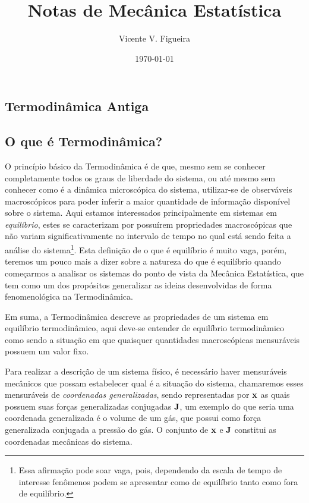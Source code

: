 \documentclass[twoside]{amsart}
\title{
Notas de Mecânica Estatística
}
\author{
  Vicente V. Figueira
       }
\date{\today}
\numberwithin{equation}{section}
\begin{document}
\maketitle

\tableofcontents


\begin{refsection}
\section{Termodinâmica Antiga}

\subsection{O que é Termodinâmica?}

O princípio básico da Termodinâmica é de que, mesmo sem se conhecer completamente todos os graus de liberdade 
do sistema, ou até mesmo sem conhecer como é a dinâmica microscópica do sistema, utilizar-se de observáveis 
macroscópicos para poder inferir a maior quantidade de informação disponível sobre o sistema. Aqui estamos 
interessados principalmente em sistemas em \emph{equilíbrio}, estes se caracterizam por possuírem propriedades 
macroscópicas que não variam significativamente no intervalo de tempo no qual está sendo feita a análise do 
sistema\footnote{Essa afirmação pode soar vaga, pois, dependendo da escala de tempo de interesse fenômenos podem se apresentar como de equilíbrio tanto como fora de equilíbrio.}. Esta definição de o que é equilíbrio é muito vaga, porém, teremos um pouco mais a dizer sobre a natureza 
do que é equilíbrio quando começarmos a analisar os sistemas do ponto de vista da Mecânica Estatística, que 
tem como um dos propósitos generalizar as ideias desenvolvidas de forma fenomenológica na Termodinâmica. 

Em suma, a Termodinâmica descreve as propriedades de um sistema em equilíbrio termodinâmico, aqui deve-se 
entender de equilíbrio termodinâmico como sendo a situação em que quaisquer quantidades macroscópicas mensuráveis possuem um valor fixo.

Para realizar a descrição de um sistema físico, é necessário haver mensuráveis mecânicos que possam estabelecer qual é a situação do sistema, chamaremos esses mensuráveis de \emph{coordenadas generalizadas}, 
sendo representadas por $\vb x$ as quais possuem suas forças generalizadas conjugadas $\vb J$, um exemplo do 
que seria uma coordenada generalizada é o volume de um gás, que possui como força generalizada conjugada a 
pressão do gás. O conjunto de $\vb x$ e $\vb J$ constitui as coordenadas mecânicas do sistema.


\end{refsection}
\end{document}

